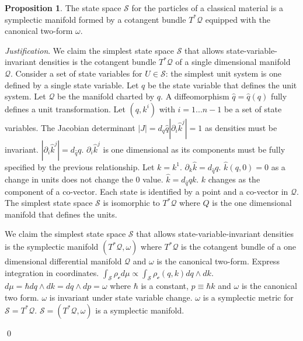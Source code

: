 \documentclass[aps,pra,10pt,twocolumn,floatfix,nofootinbib]{revtex4-1}
\numberwithin{equation}{section}
\theoremstyle{definition}
\newtheorem{prop}[equation]{Proposition}
\newenvironment{justification}{\emph{Justification}.}{\qed}
\begin{document}
\begin{prop}\label{symplectic_manifold}
The state space $\mathcal{S}$ for the particles of a classical material is a symplectic manifold formed by a cotangent bundle $T^*\mathcal{Q}$ equipped with the canonical two-form $\omega$.
\end{prop}

\begin{justification}
	We claim the simplest state space $\mathcal{S}$ that allows state-variable-invariant densities is the cotangent bundle $T^*\mathcal{Q}$ of a single dimensional manifold $\mathcal{Q}$. Consider a set of state variables for $U \in \mathcal{S}$: the simplest unit system is one defined by a single state variable. Let $q$ be the state variable that defines the unit system. Let $\mathcal{Q}$ be the manifold charted by $q$. A diffeomorphism $\hat{q}=\hat{q}(q)$ fully defines a unit transformation. Let $(q,k^i)$ with $i=1...n-1$ be a set of state variables. The Jacobian determinant $|J| = d_q\hat{q} |\partial_i\hat{k}^j|=1$ as densities must be invariant. $|\partial_i \hat{k}^j| = d_{\hat{q}}q$. $\partial_i \hat{k}^j$ is one dimensional as its components must be fully specified by the previous relationship. Let $k=k^1$. $\partial_k \hat{k} = d_{\hat{q}}q$. $\hat{k}(q,0) = 0$ as a change in units does not change the $0$ value. $\hat{k} = d_{\hat{q}}q k$. $k$ changes as the component of a co-vector. Each state is identified by a point and a co-vector in $\mathcal{Q}$. The simplest state space $\mathcal{S}$ is isomorphic to $T^*\mathcal{Q}$ where $Q$ is the one dimensional manifold that defines the units.
	
	We claim the simplest state space $\mathcal{S}$ that allows state-variable-invariant densities is the symplectic manifold $(T^*\mathcal{Q}, \omega)$ where $T^*\mathcal{Q}$ is the cotangent bundle of a one dimensional differential manifold $\mathcal{Q}$ and $\omega$ is the canonical two-form. Express integration in coordinates. $\int_{\mathcal{S}} \rho_\mathcal{c} d\mu \propto \int_{\mathcal{S}} \rho_\mathcal{c}(q, k) dq \wedge dk$. $d\mu = \hbar dq \wedge dk = dq \wedge dp = \omega$ where $\hbar$ is a constant, $p\equiv \hbar k$  and $\omega$ is the canonical two form. $\omega$ is invariant under state variable change. $\omega$ is a symplectic metric for $\mathcal{S}=T^*\mathcal{Q}$. $\mathcal{S} = (T^*\mathcal{Q}, \omega)$ is a symplectic manifold.
	

\end{justification}
\end{document}
